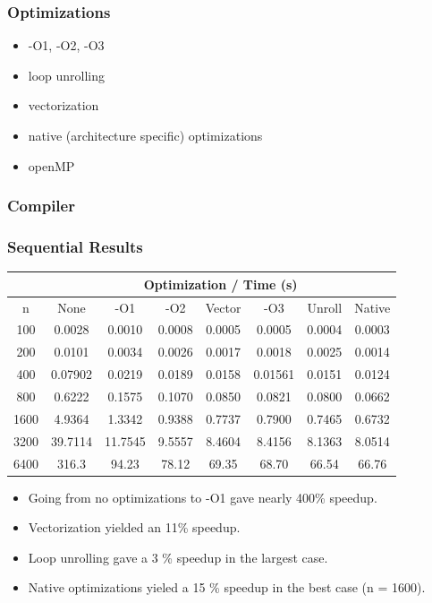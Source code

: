 \documentclass{beamer}
\begin{document}
\begin{frame}
\frametitle{Optimizations}

\begin{itemize}
\item -O1, -O2, -O3
\item loop unrolling
\item vectorization
\item native (architecture specific) optimizations
\item openMP
\end{itemize}

\end{frame}

\begin{frame}
\frametitle{Compiler}



\end{frame}

\begin{frame}[fragile]
\frametitle{Sequential Results}

\begin{tabular}{|c|c|c|c|c|c|c|c|}
\hline
& \multicolumn{7}{|c|}{Optimization / Time (s)} \\
\hline
n & None & -O1 & -O2 & Vector & -O3 & Unroll & Native\\
\hline
100	& 0.0028 & 0.0010 & 0.0008 & 0.0005 & 0.0005 & 0.0004 & 0.0003 \\
200	& 0.0101 & 0.0034 &	0.0026 & 0.0017 & 0.0018 & 0.0025 & 0.0014 \\
400	& 0.07902 & 0.0219 & 0.0189 & 0.0158 & 0.01561 & 0.0151 & 0.0124 \\
800	& 0.6222 & 0.1575 & 0.1070 & 0.0850 & 0.0821 & 0.0800 & 0.0662 \\
1600 & 4.9364 & 1.3342 & 0.9388 & 0.7737 & 0.7900 & 0.7465 & 0.6732 \\
3200&39.7114 & 11.7545 & 9.5557 & 8.4604 &	8.4156 & 8.1363 & 8.0514 \\
6400 & 316.3 & 94.23 & 78.12 &	69.35 & 68.70 & 66.54 & 66.76\\
\hline
\end{tabular}

\begin{itemize}
\setlength\itemsep{0.25em}
\item Going from no optimizations to -O1 gave nearly 400\% speedup.  
\item Vectorization yielded an 11\% speedup.
\item Loop unrolling gave a 3 \% speedup in the largest case.
\item Native optimizations yieled a 15 \% speedup in the best case (n = 1600).  
\end{itemize}

\end{frame}
\end{document}
